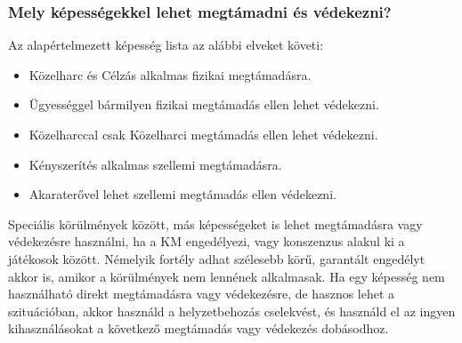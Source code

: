 
\subsubsection{Mely képességekkel lehet megtámadni és védekezni?}

Az alapértelmezett képesség lista az alábbi elveket követi:

\begin{itemize}
    \item Közelharc és Célzás alkalmas fizikai megtámadásra.
    \item Ügyességgel bármilyen fizikai megtámadás ellen lehet védekezni.
    \item Közelharccal csak Közelharci megtámadás ellen lehet védekezni.
    \item Kényszerítés alkalmas szellemi megtámadásra.
    \item Akaraterővel lehet szellemi megtámadás ellen védekezni.
\end{itemize}

Speciális körülmények között, más képességeket is lehet megtámadásra vagy védekezésre használni, ha a KM engedélyezi, vagy konszenzus alakul ki a játékosok között. Némelyik fortély adhat szélesebb körű, garantált engedélyt akkor is, amikor a körülmények nem lennének alkalmasak. Ha egy képesség nem használható direkt megtámadásra vagy védekezésre, de hasznos lehet a szituációban, akkor használd a helyzetbehozás cselekvést, és használd el az ingyen kihasználásokat a következő megtámadás vagy védekezés dobásodhoz.
